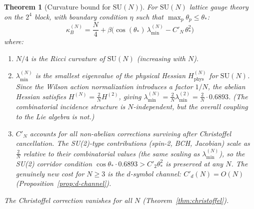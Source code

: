 \documentclass[11pt,a4paper]{article}
\theoremstyle{plain}
\newtheorem{theorem}{Theorem}[section]
\theoremstyle{definition}
\theoremstyle{remark}
\newcommand{\SU}{\mathrm{SU}}
\begin{document}
\begin{theorem}[Curvature bound for $\SU(N)$]\label{thm:curvature-SUN}
For $\SU(N)$ lattice gauge theory on the $2^4$ block, with
boundary condition $\eta$ such that $\max_p \theta_p \leq \theta_*$:
\begin{equation}\label{eq:kappa-SUN}
\kappa_B^{(N)} = \frac{N}{4}
+ \beta\bigl(\cos(\theta_*)\,\lambda_{\min}^{(N)}
- C'_N\,\theta_*^2\bigr)
\end{equation}
where:
\begin{enumerate}[label=(\roman*)]
\item $N/4$ is the Ricci curvature of $\SU(N)$ (increasing with $N$).
\item $\lambda_{\min}^{(N)}$ is the smallest eigenvalue of the
  physical Hessian $H^{(N)}_{\mathrm{phys}}$ for $\SU(N)$. Since
  the Wilson action normalization introduces a factor $1/N$,
  the abelian Hessian satisfies $H^{(N)} = \frac{2}{N}H^{(2)}$,
  giving $\lambda_{\min}^{(N)} = \frac{2}{N}\lambda_{\min}^{(2)}
  = \frac{2}{N}\cdot 0.6893$. (The combinatorial incidence
  structure is $N$-independent, but the overall coupling to the
  Lie algebra is not.)
\item $C'_N$ accounts for all non-abelian corrections surviving
  after Christoffel cancellation. The SU(2)-type contributions
  (spin-2, BCH, Jacobian) scale as $\frac{2}{N}$ relative to
  their combinatorial values (the same scaling as
  $\lambda_{\min}^{(N)}$), so the SU(2) corridor condition
  $\cos\theta_*\cdot 0.6893 > C'_2\theta_*^2$ is preserved
  at any $N$. The genuinely new cost for $N \geq 3$ is the
  $d$-symbol channel: $C'_d(N) = O(N)$ (Proposition~\ref{prop:d-channel}).
\end{enumerate}

The Christoffel correction vanishes for all $N$
(Theorem~\ref{thm:christoffel}).
\end{theorem}
\end{document}
